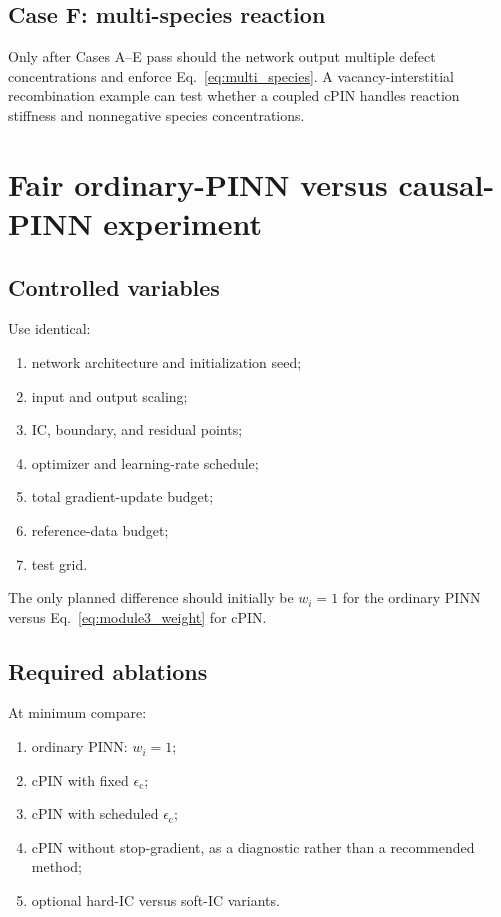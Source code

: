 \documentclass[11pt]{article}
\newcommand{\epsc}{\epsilon_{\mathrm{c}}}
\begin{document}
\subsection{Case F: multi-species reaction}

Only after Cases A--E pass should the network output multiple defect concentrations and enforce Eq.~\eqref{eq:multi_species}. A vacancy-interstitial recombination example can test whether a coupled cPIN handles reaction stiffness and nonnegative species concentrations.

\section{Fair ordinary-PINN versus causal-PINN experiment}

\subsection{Controlled variables}

Use identical:
\begin{enumerate}[label=\arabic*.]
    \item network architecture and initialization seed;
    \item input and output scaling;
    \item IC, boundary, and residual points;
    \item optimizer and learning-rate schedule;
    \item total gradient-update budget;
    \item reference-data budget;
    \item test grid.
\end{enumerate}
The only planned difference should initially be $w_i=1$ for the ordinary PINN versus Eq.~\eqref{eq:module3_weight} for cPIN.

\subsection{Required ablations}

At minimum compare:
\begin{enumerate}[label=\arabic*.]
    \item ordinary PINN: $w_i=1$;
    \item cPIN with fixed $\epsc$;
    \item cPIN with scheduled $\epsc$;
    \item cPIN without stop-gradient, as a diagnostic rather than a recommended method;
    \item optional hard-IC versus soft-IC variants.
\end{enumerate}
\end{document}
